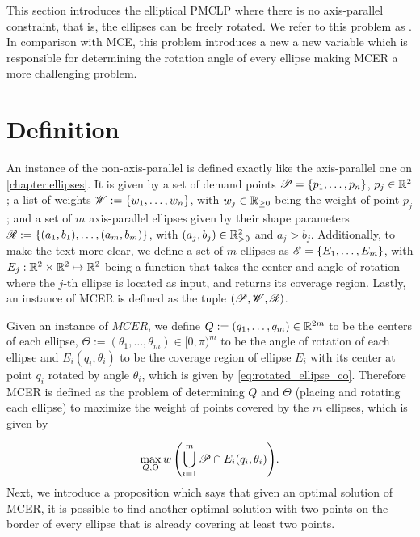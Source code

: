 This section introduces the elliptical PMCLP where there is no axis-parallel constraint, that is, the ellipses can be freely rotated. We refer to this problem as . In comparison with MCE, this problem introduces a new a new variable which is responsible for determining the rotation angle of every ellipse making MCER a more challenging problem.

\section{Definition}

An instance of the non-axis-parallel is defined exactly like the axis-parallel one on \autoref{chapter:ellipses}. It is given by a set of demand points $\mathscr{P}=\{p_1, \dots, p_n\}$, $p_j\in\mathbb{R}^2$; a list of weights $\mathscr{W}:=\{w_1, \dots, w_n\}$, with $w_j\in\mathbb{R}_{\ge0}$ being the weight of point $p_j$;
and a set of $m$ axis-parallel ellipses given by their shape parameters $\mathscr{R}:=\{(a_1, b_1), \dots, (a_m, b_m)\}$, with $(a_j, b_j)\in\mathbb{R}_{>0}^2$ and $a_j>b_j$.
Additionally, to make the text more clear, we define a set of $m$ ellipses as $\mathscr{E} = \{E_1, \dots, E_m\}$, with $E_j : \mathbb{R}^2\times\mathbb{R}^2 \mapsto \mathbb{R}^2$ being a function that takes the center and angle of rotation where the $j$-th ellipse is located as input, and returns its coverage region.
Lastly, an instance of MCER is defined as the tuple $(\mathscr{P}, \mathscr{W}, \mathscr{R})$.

Given an instance of $MCER$, we define $Q:=(q_1, \dots, q_m) \in \mathbb{R}^{2m}$ to be the centers of each ellipse, $\Theta:=(\theta_1, \dots, \theta_m) \in [0, \pi)^m$ to be the angle of rotation of each ellipse and $E_i(q_i, \theta_i)$ to be the coverage region of ellipse $E_i$ with its center at point $q_i$ rotated by angle $\theta_i$, which is given by \autoref{eq:rotated_ellipse_co}. Therefore MCER is defined as the problem of determining $Q$ and $\Theta$ (placing and rotating each ellipse) to maximize the weight of points covered by the $m$ ellipses, which is given by

\begin{equation}\label{eq:optMCEn}
\max_{Q, \Theta}{w\left(\bigcup_{i=1}^{m} \mathscr{P} \cap E_i(q_i, \theta_i)\right)}.
\end{equation}
Next, we introduce a proposition which says that given an optimal solution of MCER, it is possible to find another optimal solution with two points on the border of every ellipse that is already covering at least two points.

